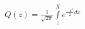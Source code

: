 \documentclass[20pt]{extreport}
\begin{document}
\begin{center}\(

Q(z)=\frac{1}{\sqrt{2\pi }}\int\limits_{z}^{X}e^{\frac{-x^{2}}{2}d x}

\)
\end{center}
\end{document}
